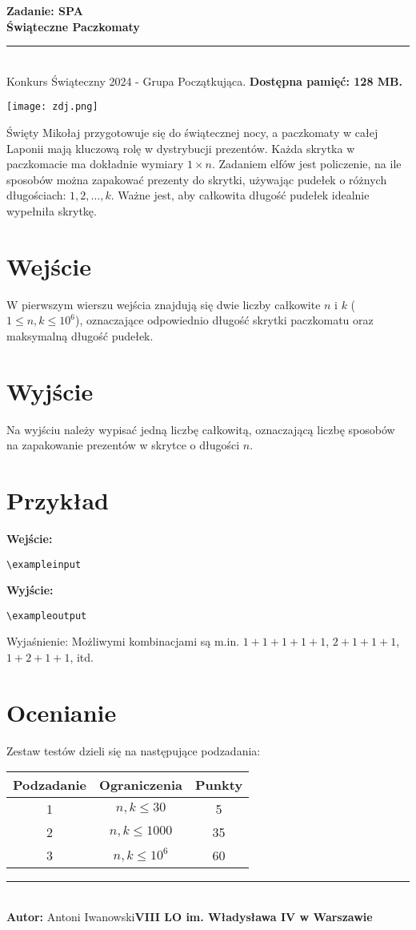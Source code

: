 \documentclass[a4paper,11pt]{article}
\newcommand{\tasktitle}{Świąteczne Paczkomaty}
\newcommand{\taskshort}{SPA}
\newcommand{\contestinfo}{Konkurs Świąteczny 2024 - Grupa Początkująca.}
\newcommand{\memorylimit}{128 MB}
\newcommand{\exampleinput}{5 2}
\newcommand{\exampleoutput}{8}
\newcommand{\explanation}{Możliwymi kombinacjami są m.in. $1+1+1+1+1$, $2+1+1+1$, $1+2+1+1$, itd.}
\newcommand{\authorinfo}{Antoni Iwanowski}
\newcommand{\schoolinfo}{VIII LO im. Władysława IV w Warszawie}
\newcommand{\subtasktable}{%
\begin{tabular}{|c|c|c|}
\hline
Podzadanie & Ograniczenia & Punkty \\
\hline
1 & $n, k \leq 30$ & 5 \\
2 & $n, k \leq 1000$ & 35 \\
3 & $n, k \leq 10^6$ & 60 \\
\hline
\end{tabular}}
\begin{document}
\noindent\textbf{\LARGE Zadanie: \taskshort} \\
\textbf{\Large \tasktitle} \\
\rule{\textwidth}{0.4pt} \\
\small \contestinfo \textbf{ Dostępna pamięć: \memorylimit.}

\begin{center}
\texttt{[image: zdj.png]} %
\end{center}

\noindent Święty Mikołaj przygotowuje się do świątecznej nocy, a paczkomaty w całej Laponii mają kluczową rolę w dystrybucji prezentów. Każda skrytka w paczkomacie ma dokładnie wymiary $1 \times n$. Zadaniem elfów jest policzenie, na ile sposobów można zapakować prezenty do skrytki, używając pudełek o różnych długościach: $1, 2, \dots, k$. Ważne jest, aby całkowita długość pudełek idealnie wypełniła skrytkę.

\section*{Wejście}
W pierwszym wierszu wejścia znajdują się dwie liczby całkowite $n$ i $k$ ($1 \leq n, k \leq 10^6$), oznaczające odpowiednio długość skrytki paczkomatu oraz maksymalną długość pudełek.

\section*{Wyjście}
Na wyjściu należy wypisać jedną liczbę całkowitą, oznaczającą liczbę sposobów na zapakowanie prezentów w skrytce o długości $n$.

\section*{Przykład}
\begin{multicols}{2}
\noindent\textbf{Wejście:}
\begin{verbatim}
\exampleinput
\end{verbatim}

\noindent\textbf{Wyjście:}
\begin{verbatim}
\exampleoutput
\end{verbatim}
\end{multicols}

\noindent Wyjaśnienie: \explanation

\section*{Ocenianie}
Zestaw testów dzieli się na następujące podzadania:
\begin{center}
\subtasktable
\end{center}

\vspace{1cm}
\noindent \rule{\textwidth}{0.4pt} \\
\textbf{Autor:} \authorinfo  \hfill \textbf{\schoolinfo} \\
\end{document}
